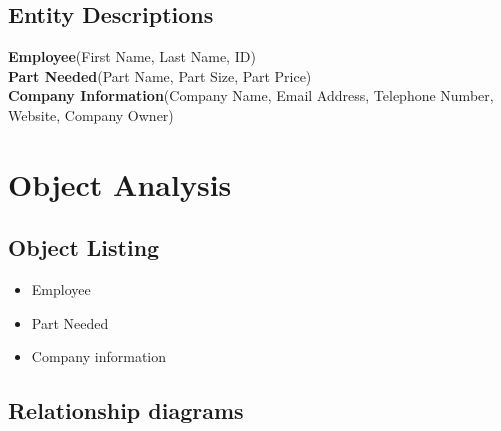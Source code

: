 \subsection{Entity Descriptions}
\textbf{Employee}(First Name, Last Name, ID) \\
\textbf{Part Needed}(Part Name, Part Size, Part Price) \\
\textbf{Company Information}(Company Name, Email Address, Telephone Number, Website, Company Owner)  \\
\section{Object Analysis}

\subsection{Object Listing}
\begin{itemize}
	\item Employee
	\item Part Needed
	\item Company information
\end{itemize}

\subsection{Relationship diagrams}

